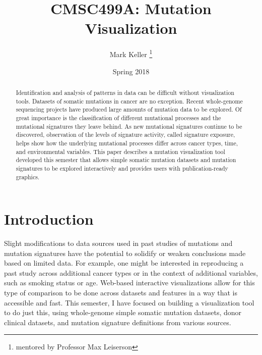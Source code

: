 \documentclass[12pt, letterpaper]{article}
\title{CMSC499A: Mutation Visualization}
\author{Mark Keller \thanks{mentored by Professor Max Leiserson}}
\date{Spring 2018}
\begin{document}
\maketitle

\begin{abstract}
Identification and analysis of patterns in data can be difficult without visualization tools. 
Datasets of somatic mutations in cancer are no exception.
Recent whole-genome sequencing projects have produced large amounts of mutation data to be explored.
Of great importance is the classification of different mutational processes and the mutational signatures\cite{alexandrov2013signatures} they leave behind.
As new mutational signatures continue to be discovered, observation of the levels of signature activity, called signature exposure, helps show how the underlying mutational processes differ across cancer types, time, and environmental variables.
This paper describes a mutation visualization tool developed this semester that allows simple somatic mutation datasets and mutation signatures to be explored interactively and provides users with publication-ready graphics.
\end{abstract}

\section{Introduction}
Slight modifications to data sources used in past studies of mutations and mutation signatures have the potential to solidify or weaken conclusions made based on limited data.
For example, one might be interested in reproducing a past study across additional cancer types or in the context of additional variables, such as smoking status or age.
Web-based interactive visualizations allow for this type of comparison to be done across datasets and features in a way that is accessible and fast.
This semester, I have focused on building a visualization tool to do just this, using whole-genome simple somatic mutation datasets, donor clinical datasets, and mutation signature definitions from various sources.
\end{document}

